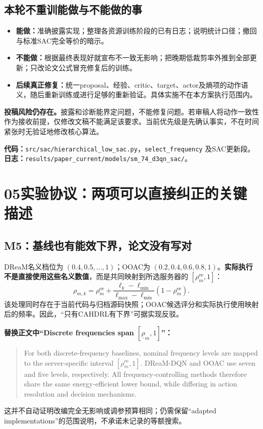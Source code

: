 \documentclass[UTF8,11pt,a4paper,fontset=fandol]{ctexart}
\newenvironment{draft}{\begin{quote}\small\setlength{\parskip}{4pt}}{\end{quote}}
\newcommand{\partpage}[2]{\section*{#1\quad #2}}
\newcommand{\code}[1]{\nolinkurl{#1}}
\begin{document}
\subsection*{本轮不重训能做与不能做的事}
\begin{itemize}
\item \textbf{能做：}准确披露实现；整理各资源训练阶段的已有日志；说明统计口径；撤回与标准SAC完全等价的暗示。
\item \textbf{不能做：}根据最终表现好就宣布不一致无影响；把晚期低裁剪率外推到全部更新；只改论文公式冒充修复后的训练。
\item \textbf{后续真正修复：}统一proposal、经验、critic、target、actor及熵项的动作语义，随后重新训练或进行足够的重新验证。具体实施不在本方案执行范围内。
\end{itemize}

\begin{risk}
\textbf{投稿风险仍存在。}披露和诊断能界定问题，不能修复问题。若审稿人将动作一致性作为接收前提，仅修改文稿不能满足该要求。当前优先级是先确认事实，不在时间紧张时无验证地修改核心算法。
\end{risk}

\textbf{代码：}\code{src/sac/hierarchical_low_sac.py}，\code{select_frequency} 及SAC更新段。\textbf{日志：}\code{results/paper_current/models/sm_74_d3qn_sac/}。

\newpage
\partpage{05}{实验协议：两项可以直接纠正的关键描述}
\subsection*{M5：基线也有能效下界，论文没有写对}
DReaM名义档位为 $(0.4,0.5,\ldots,1)$；OOAC为 $(0.2,0.4,0.6,0.8,1)$。\textbf{实际执行不是直接使用这些名义数值}，而是共同映射到所选服务器的 $[\rho_m^{\mathrm{ee}},1]$：
\[
\rho_{m,k}=\rho_m^{\mathrm{ee}}+
\frac{\ell_k-\ell_{\min}}{\ell_{\max}-\ell_{\min}}
(1-\rho_m^{\mathrm{ee}}).
\]
该处理同时存在于当前代码与归档源码快照；OOAC候选评分和实际执行使用映射后的频率。因此，“只有CAHDRL有下界”可据实现反驳。

\textbf{替换正文中“Discrete frequencies span $[\underline\rho_m,1]$”：}
\begin{draft}
For both discrete-frequency baselines, nominal frequency levels are mapped to the server-specific interval $[\rho_m^{\mathrm{ee}},1]$. DReaM-DQN and OOAC use seven and five levels, respectively. All frequency-controlling methods therefore share the same energy-efficient lower bound, while differing in action resolution and decision mechanisms.
\end{draft}
这并不自动证明改编完全无影响或调参预算相同；仍需保留“adapted implementations”的范围说明，不承诺未记录的等额搜索。
\end{document}
